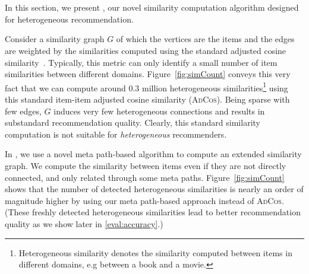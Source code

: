 \vspace{-2mm}
\section{{\large \bf \graphsim}}
\label{Sim}
In this section, we present \graphsim, our novel similarity computation algorithm designed for heterogeneous recommendation. 

 Consider a similarity graph $G$ of which the vertices are the items and the edges are weighted by the similarities computed using the standard adjusted cosine similarity~\cite{sarwar2001item}. Typically, this metric can only identify a small number of item
similarities between different domains. Figure~\ref{fig:simCount} conveys this very fact  that we can compute around 0.3 million heterogeneous similarities\footnote{Heterogeneous similarity denotes the similarity computed between items in different domains, e.g between a book and a movie.} using this standard item-item adjusted cosine similarity (\textsc{AdCos}). Being sparse with few edges, $G$ induces very few heterogeneous connections and results in substandard recommendation quality. Clearly, this standard similarity computation is not suitable for \emph{heterogeneous} recommenders. 

In \crossrec, we use a novel meta path-based algorithm to compute an extended similarity graph. We compute the similarity between items even if they are not directly connected, and only related through some meta paths. 
Figure~\ref{fig:simCount} shows that the number of detected heterogeneous similarities is nearly an order of magnitude higher by using our meta path-based approach instead of \textsc{AdCos}. (These freshly detected heterogeneous similarities lead to better recommendation quality as we show later in \autoref{eval:accuracy}.)



